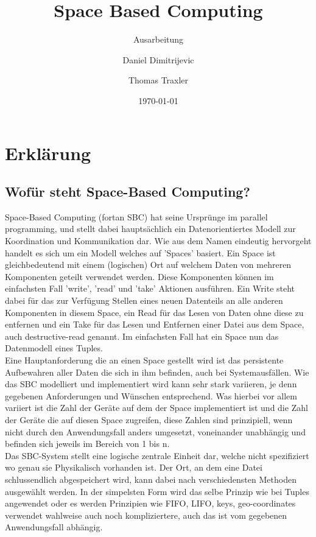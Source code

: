 \documentclass[a4paper,12pt]{scrreprt}
\begin{document}
\author{Daniel Dimitrijevic \and Thomas Traxler} %
\title{ Space Based Computing } %
\subject{VSDB} %
\subtitle{ Ausarbeitung } %
\date{\today} %
\publishers{5AHITT} %

\maketitle
\tableofcontents



\chapter{Erklärung}
	\section{Wofür steht Space-Based Computing?}
		Space-Based Computing (fortan SBC) hat seine Ursprünge im parallel programming, und stellt dabei hauptsächlich ein Datenorientiertes Modell zur Koordination und Kommunikation dar. Wie aus dem Namen eindeutig hervorgeht handelt es sich um ein Modell welches auf 'Spaces' basiert. Ein Space ist gleichbedeutend mit einem (logischen) Ort auf welchem Daten von mehreren Komponenten geteilt verwendet werden. Diese Komponenten können im einfachsten Fall 'write', 'read' und 'take' Aktionen ausführen. Ein Write steht dabei für das zur Verfügung Stellen eines neuen Datenteils an alle anderen Komponenten in diesem Space, ein Read für das Lesen von Daten ohne diese zu entfernen und ein Take für das Lesen und Entfernen einer Datei aus dem Space, auch destructive-read genannt. Im einfachsten Fall hat ein Space nun das Datenmodell eines Tuples.\\ Eine Hauptanforderung die an einen Space  gestellt wird ist das persistente Aufbewahren aller Daten die sich in ihm befinden, auch bei Systemausfällen. Wie das SBC modelliert und implementiert wird kann sehr stark variieren, je denn gegebenen Anforderungen und Wünschen entsprechend. Was hierbei vor allem variiert ist die Zahl der Geräte auf dem der Space implementiert ist und die Zahl der Geräte die auf diesen Space zugreifen, diese Zahlen sind prinzipiell, wenn nicht durch den Anwendungsfall anders umgesetzt, voneinander unabhängig und befinden sich jeweils im Bereich von 1 bis n. \\   Das SBC-System stellt eine logische zentrale Einheit dar, welche nicht spezifiziert wo genau sie Physikalisch vorhanden ist. Der Ort, an dem eine Datei schlussendlich abgespeichert wird, kann dabei nach verschiedensten Methoden ausgewählt werden. In der simpelsten Form wird das selbe Prinzip wie bei Tuples angewendet %
		oder es werden Prinzipien  wie FIFO, LIFO, keys, geo-coordinates verwendet wahlweise auch noch kompliziertere, auch das ist vom gegebenen Anwendungsfall abhängig.
\end{document}
